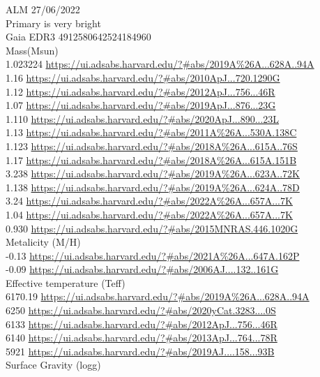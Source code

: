 ALM 27/06/2022\\
Primary is very bright\\
Gaia EDR3 4912580642524184960\\
Mass(Msun)\\
1.023224 \url{https://ui.adsabs.harvard.edu/?#abs/2019A%26A...628A..94A}\\
1.16 \url{https://ui.adsabs.harvard.edu/?#abs/2010ApJ...720.1290G}\\
1.12 \url{https://ui.adsabs.harvard.edu/?#abs/2012ApJ...756...46R}\\
1.07 \url{https://ui.adsabs.harvard.edu/?#abs/2019ApJ...876...23G}\\
1.110 \url{https://ui.adsabs.harvard.edu/?#abs/2020ApJ...890...23L}\\
1.13 \url{https://ui.adsabs.harvard.edu/?#abs/2011A%26A...530A.138C}\\
1.123 \url{https://ui.adsabs.harvard.edu/?#abs/2018A%26A...615A..76S}\\
1.17 \url{https://ui.adsabs.harvard.edu/?#abs/2018A%26A...615A.151B}\\
3.238 \url{https://ui.adsabs.harvard.edu/?#abs/2019A%26A...623A..72K}\\
1.138 \url{https://ui.adsabs.harvard.edu/?#abs/2019A%26A...624A..78D}\\
3.24 \url{https://ui.adsabs.harvard.edu/?#abs/2022A%26A...657A...7K}\\
1.04 \url{https://ui.adsabs.harvard.edu/?#abs/2022A%26A...657A...7K}\\
0.930 \url{https://ui.adsabs.harvard.edu/?#abs/2015MNRAS.446.1020G}\\
Metalicity (M/H)\\
-0.13 \url{https://ui.adsabs.harvard.edu/?#abs/2021A%26A...647A.162P}\\
-0.09 \url{https://ui.adsabs.harvard.edu/?#abs/2006AJ....132..161G}\\
Effective temperature (Teff) \\
6170.19 \url{https://ui.adsabs.harvard.edu/?#abs/2019A%26A...628A..94A}\\
6250 \url{https://ui.adsabs.harvard.edu/?#abs/2020yCat.3283....0S}\\
6133 \url{https://ui.adsabs.harvard.edu/?#abs/2012ApJ...756...46R}\\
6140 \url{https://ui.adsabs.harvard.edu/?#abs/2013ApJ...764...78R}\\
5921 \url{https://ui.adsabs.harvard.edu/?#abs/2019AJ....158...93B}\\
Surface Gravity (logg) \\
